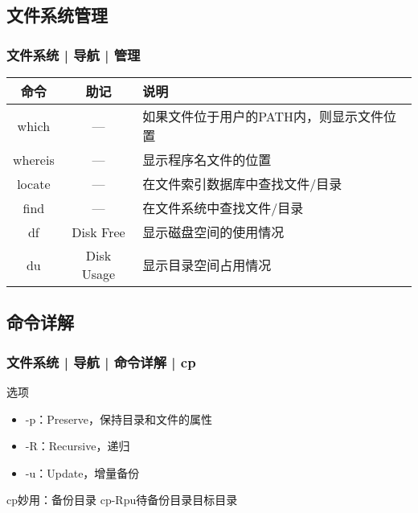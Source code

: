 \subsection{文件系统管理}
\begin{frame}
  \frametitle{文件系统 | 导航 | \alert{管理}}
  \begin{table}
    \centering
    \begin{tabularx}{0.9\textwidth}{ccX}
      \hline
      \rowcolor{blue!50}命令 & 助记 & 说明\\
      \hline
      which & --- & 如果文件位于用户的PATH内，则显示文件位置\\
      whereis & --- & 显示程序名文件的位置\\
      \hline
      locate & --- & 在文件索引数据库中查找文件/目录\\
      find & --- & 在文件系统中查找文件/目录\\
      \hline
      df & Disk Free & 显示磁盘空间的使用情况\\
      du & Disk Usage & 显示目录空间占用情况\\
      \hline
    \end{tabularx}
  \end{table}
\end{frame}

\subsection{命令详解}
\begin{frame}
  \frametitle{文件系统 | 导航 | 命令详解 | cp}
  \begin{block}{选项}
    \begin{itemize}
      \item -p：Preserve，保持目录和文件的属性
      \item -R：Recursive，递归
      \item -u：Update，增量备份
    \end{itemize}
  \end{block}
  \pause
  \begin{block}{cp妙用：备份目录}
    cp\quad -Rpu\quad 待备份目录\quad 目标目录
  \end{block}
\end{frame}

